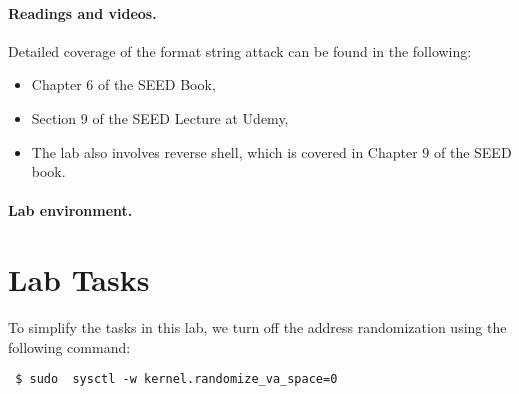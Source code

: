 \noindent
{}


\paragraph{Readings and videos.}
Detailed coverage of the format string attack can be found in the following:

\begin{itemize}
\item Chapter 6 of the SEED Book, \seedbook
\item Section 9 of the SEED Lecture at Udemy, \seedcsvideo
\item The lab also involves reverse shell, which is covered in Chapter 9 of the SEED book.
\end{itemize}



\paragraph{Lab environment.} \seedenvironment




\newpage
\section{Lab Tasks}

To simplify the tasks in this lab, we turn off the address randomization
using the following command: 

\begin{lstlisting}
 $ sudo  sysctl -w kernel.randomize_va_space=0
\end{lstlisting}


